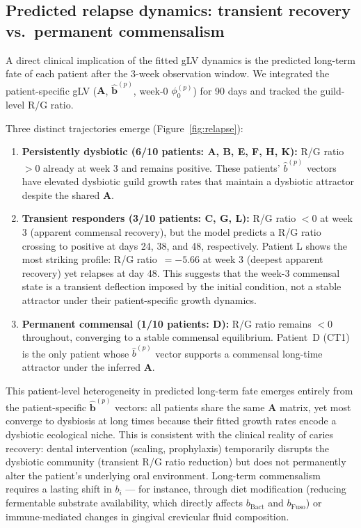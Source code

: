 \documentclass[11pt,a4paper]{article}
\newcommand{\bA}{\mathbf{A}}
\newcommand{\bb}{\mathbf{b}}
\begin{document}
\subsection{Predicted relapse dynamics: transient recovery vs.\ permanent commensalism}
\label{ssec:relapse}

A direct clinical implication of the fitted gLV dynamics is the predicted
long-term fate of each patient after the 3-week observation window.
We integrated the patient-specific gLV ($\bA$, $\hat{\bb}^{(p)}$, week-0 $\phi_0^{(p)}$)
for 90 days and tracked the guild-level R/G ratio.

Three distinct trajectories emerge (Figure~\ref{fig:relapse}):

\begin{enumerate}[noitemsep]
  \item \textbf{Persistently dysbiotic (6/10 patients: A, B, E, F, H, K):}
        R/G ratio $>0$ already at week 3 and remains positive.
        These patients' $\hat{b}^{(p)}$ vectors have elevated dysbiotic guild growth
        rates that maintain a dysbiotic attractor despite the shared $\bA$.

  \item \textbf{Transient responders (3/10 patients: C, G, L):}
        R/G ratio $<0$ at week 3 (apparent commensal recovery), but the model predicts
        a R/G ratio crossing to positive at days 24, 38, and 48, respectively.
        Patient L shows the most striking profile: R/G ratio~$=-5.66$ at week 3
        (deepest apparent recovery) yet relapses at day 48.
        This suggests that the week-3 commensal state is a transient deflection
        imposed by the initial condition, not a stable attractor under their
        patient-specific growth dynamics.

  \item \textbf{Permanent commensal (1/10 patients: D):}
        R/G ratio remains $<0$ throughout, converging to a stable commensal equilibrium.
        Patient~D (CT1) is the only patient whose $\hat{b}^{(p)}$ vector supports
        a commensal long-time attractor under the inferred $\bA$.
\end{enumerate}

This patient-level heterogeneity in predicted long-term fate emerges entirely
from the patient-specific $\hat{\bb}^{(p)}$ vectors: all patients share the
same $\bA$ matrix, yet most converge to dysbiosis at long times because their
fitted growth rates encode a dysbiotic ecological niche.
This is consistent with the clinical reality of caries recovery: dental
intervention (scaling, prophylaxis) temporarily disrupts the dysbiotic
community (transient R/G ratio reduction) but does not permanently alter the
patient's underlying oral environment.
Long-term commensalism requires a lasting shift in $b_i$ --- for instance,
through diet modification (reducing fermentable substrate availability,
which directly affects $b_{\text{Bact}}$ and $b_{\text{Fuso}}$) or immune-mediated
changes in gingival crevicular fluid composition.
\end{document}
